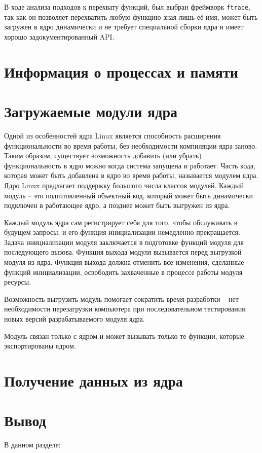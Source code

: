 В ходе анализа подходов к перехвату функций, был выбран фреймворк \texttt{ftrace}, так как он позволяет перехватить любую функцию зная лишь её имя, может быть загружен в ядро динамически и не требует специальной сборки ядра и имеет хорошо задокументированный API.

\section{Информация о процессах и памяти}

\section{Загружаемые модули ядра}

Одной из особенностей ядра Linux является способность расширения функциональности во время работы, без необходимости компиляции ядра заново. Таким образом, существует возможность добавить (или убрать) функциональность в ядро можно когда система запущена и работает. Часть кода, которая может быть добавлена в ядро во время работы, называется модулем ядра. Ядро Linux предлагает поддержку большого числа классов модулей. Каждый модуль -- это подготовленный объектный код, который может быть динамически подключен в работающее ядро, а позднее может быть выгружен из ядра.

Каждый модуль ядра сам регистрирует себя для того, чтобы обслуживать в будущем запросы, и его функция инициализации немедленно прекращается. Задача инициализации модуля заключается в подготовке функций модуля для последующего вызова. Функция выхода модуля вызывается перед выгрузкой модуля из ядра. Функция выхода должна отменить все изменения, сделанные функций инициализации, освободить захваченные в процессе работы модуля ресурсы. 

Возможность выгрузить модуль помогает сократить время разработки -- нет необходимости перезагрузки компьютера при последовательном тестировании новых версий разрабатываемого модуля ядра.

Модуль связан только с ядром и может вызывать только те функции, которые экспортированы ядром.

\section{Получение данных из ядра}

\section*{Вывод}



В данном разделе:


